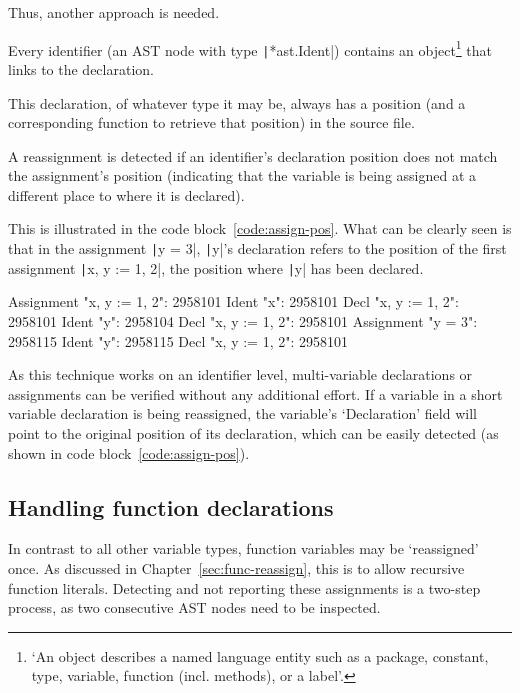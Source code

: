 Thus, another approach is needed.

Every identifier (an AST node with type \texttt|*ast.Ident|) contains an object\footnote{`An
    object describes a named language entity such as a package, constant, type, variable,
function (incl. methods), or a label'\autocite{go-ast-object}.} that links to the declaration.

This declaration, of whatever type it may be, always has a position (and a corresponding function
to retrieve that position) in the source file.

A reassignment is detected if an identifier's declaration position does not match the assignment's
position (indicating that the variable is being assigned at a different place to where it is
declared).

This is illustrated in the code block~\ref{code:assign-pos}. What can be clearly seen is that in
the assignment \texttt|y = 3|, \texttt|y|'s declaration refers to the position
of the first assignment \texttt|x, y := 1, 2|, the position where \texttt|y| has
been declared.

\begin{code}
    \begin{gocode}
Assignment "x, y := 1, 2": 2958101
        Ident "x": 2958101
                Decl "x, y := 1, 2": 2958101
        Ident "y": 2958104
                Decl "x, y := 1, 2": 2958101
Assignment "y = 3": 2958115
        Ident "y": 2958115
                Decl "x, y := 1, 2": 2958101
    \end{gocode}
  \label{code:assign-pos}
\end{code}
As this technique works on an identifier level, multi-variable declarations or assignments
can be verified without any additional effort.
If a variable in a short variable declaration is being reassigned, the variable's `Declaration'
field will point to the original position of its declaration, which can be easily detected
(as shown in code block~\ref{code:assign-pos}).

\subsection{Handling function declarations}

In contrast to all other variable types, function variables may be `reassigned' once.
As discussed in Chapter~\ref{sec:func-reassign}, this is to allow recursive function
literals. Detecting and not reporting these assignments is a two-step process, as two
consecutive AST nodes need to be inspected.

